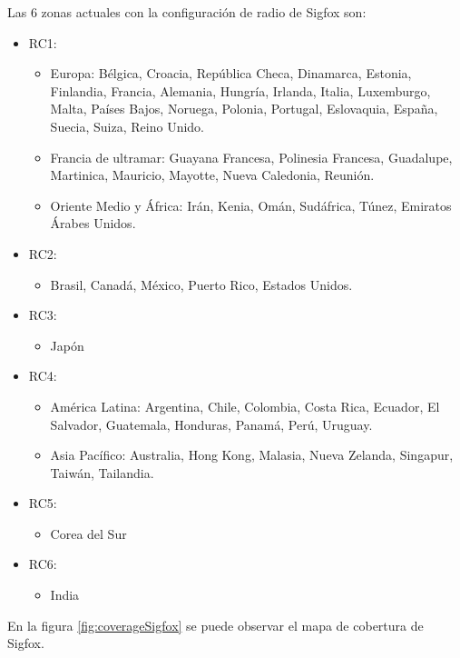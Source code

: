 Las 6 zonas  actuales con la configuración de radio de Sigfox son:
\begin{itemize}
    \item RC1:
        \begin{itemize}
            \item Europa: Bélgica, Croacia, República Checa, Dinamarca, Estonia, Finlandia, Francia, Alemania, Hungría, Irlanda, Italia, Luxemburgo, Malta, Países Bajos, Noruega, Polonia, Portugal, Eslovaquia, España, Suecia, Suiza, Reino Unido.
            \item Francia de ultramar: Guayana Francesa, Polinesia Francesa, Guadalupe, Martinica, Mauricio, Mayotte, Nueva Caledonia, Reunión.
            \item Oriente Medio y África: Irán, Kenia, Omán, Sudáfrica, Túnez, Emiratos Árabes Unidos.
        \end{itemize}
    \item RC2:
        \begin{itemize}
            \item Brasil, Canadá, México, Puerto Rico, Estados Unidos.
        \end{itemize}
    \item RC3:
        \begin{itemize}
            \item Japón
        \end{itemize}
    \item RC4:
        \begin{itemize}
            \item América Latina: Argentina, Chile, Colombia, Costa Rica, Ecuador, El Salvador, Guatemala, Honduras, Panamá, Perú, Uruguay.
            \item Asia Pacífico: Australia, Hong Kong, Malasia, Nueva Zelanda, Singapur, Taiwán, Tailandia.
        \end{itemize}
    \item RC5:
        \begin{itemize}
            \item Corea del Sur
        \end{itemize}
    \item RC6:
        \begin{itemize}
            \item India
        \end{itemize}
\end{itemize}

En la figura \ref{fig:coverageSigfox} se puede observar el mapa de cobertura de Sigfox.

